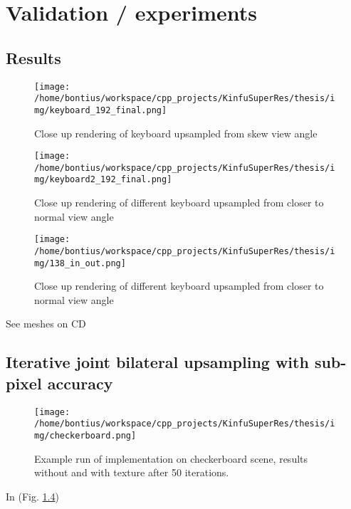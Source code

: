 \documentclass{ucl_thesis}
\newcommand{\figref}[1]{(Fig. \ref{#1})}
\begin{document}
\chapter{Validation / experiments}
\label{chp:validation}

\section{Results}
\label{sec:results}

\begin{figure}[h!]\centering
    \texttt{[image: /home/bontius/workspace/cpp\_projects/KinfuSuperRes/thesis/img/keyboard\_192\_final.png]}
    \caption{Close up rendering of keyboard upsampled from skew view angle}
    \label{fig:keyboard_192}
\end{figure}

\begin{figure}[h!]\centering
    \texttt{[image: /home/bontius/workspace/cpp\_projects/KinfuSuperRes/thesis/img/keyboard2\_192\_final.png]}
    \caption{Close up rendering of different keyboard upsampled from closer to normal view angle}
    \label{fig:keyboard2_192}
\end{figure}

\begin{figure}[h!]\centering
    \texttt{[image: /home/bontius/workspace/cpp\_projects/KinfuSuperRes/thesis/img/138\_in\_out.png]}
    \caption{Close up rendering of different keyboard upsampled from closer to normal view angle}
    \label{fig:keyboard2_192}
\end{figure}

See meshes on CD

\section{Iterative joint bilateral upsampling with sub-pixel accuracy}
\label{sec:yang}

\begin{figure}[h!]\centering 
        \texttt{[image: /home/bontius/workspace/cpp\_projects/KinfuSuperRes/thesis/img/checkerboard.png]}        
        \caption{Example run of implementation on checkerboard scene, results without and with texture after 50 iterations.}
        \label{fig:yang_checkerboard}
\end{figure}

In \figref{fig:yang_checkerboard}
\end{document}
